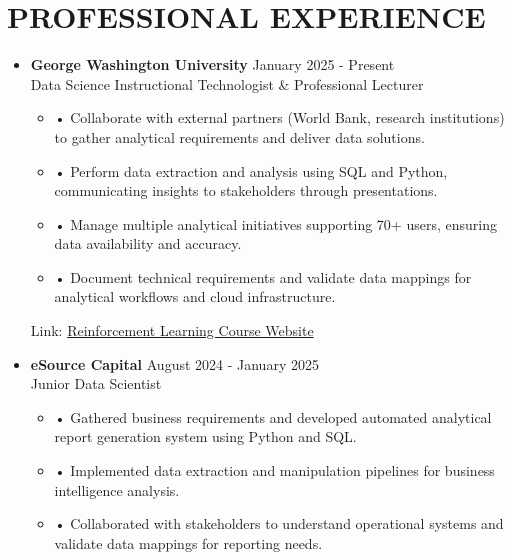 \documentclass[a4paper,9pt]{extarticle}
\begin{document}

\section*{PROFESSIONAL EXPERIENCE}

\begin{itemize}[leftmargin=0.4cm, label={}]
    \item \textbf{George Washington University} \hfill January 2025 - Present \\
    Data Science Instructional Technologist \& Professional Lecturer
    \vspace{-0.1cm}
    \begin{itemize}[leftmargin=0.3cm, label={}]
    \item \small{•} \normalsize{Collaborate with external partners (World Bank, research institutions) to gather analytical requirements and deliver data solutions.}
    \item \small{•} \normalsize{Perform data extraction and analysis using SQL and Python, communicating insights to stakeholders through presentations.}
    \item \small{•} \normalsize{Manage multiple analytical initiatives supporting 70+ users, ensuring data availability and accuracy.}
    \item \small{•} \normalsize{Document technical requirements and validate data mappings for analytical workflows and cloud infrastructure.}
    \end{itemize}
    Link: \href{https://twallett.com/courses/reinforcement-learning/}{Reinforcement Learning Course Website}
\end{itemize}

\noindent
\begin{itemize}[leftmargin=0.4cm, label={}]
    \item \textbf{eSource Capital} \hfill August 2024 - January 2025 \\
    Junior Data Scientist 
    \vspace{-0.1cm}
    \begin{itemize}[leftmargin=0.3cm, label={}]
    \item \small{•} \normalsize{Gathered business requirements and developed automated analytical report generation system using Python and SQL.}
    \item \small{•} \normalsize{Implemented data extraction and manipulation pipelines for business intelligence analysis.}
    \item \small{•} \normalsize{Collaborated with stakeholders to understand operational systems and validate data mappings for reporting needs.}
\end{itemize}
\end{itemize}
\end{document}
